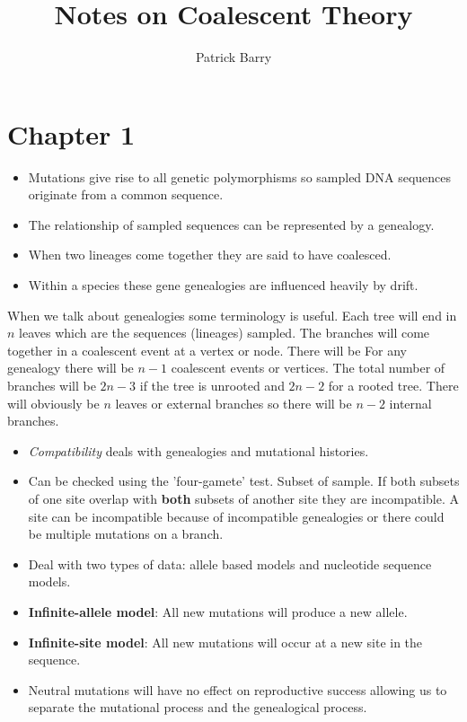 \documentclass[11pt, oneside]{article}
\title{Notes on Coalescent Theory}
\author{Patrick Barry}
\begin{document}
\maketitle
\section*{Chapter 1}
\begin{itemize}
\item{} Mutations give rise to all genetic polymorphisms so sampled DNA sequences 
originate from a common sequence. 
\item{} The relationship of sampled sequences can be represented by a genealogy.
\item{} When two lineages come together they are said to have coalesced. 
\item{} Within a species these gene genealogies are influenced heavily by drift.
\end{itemize} 

When we talk about genealogies some terminology is useful. Each tree will end in 
$n$ leaves which are the sequences (lineages) sampled. The branches 
will come together in a coalescent event at a vertex or node. There will be 
For any genealogy there will be $n-1$ coalescent events or vertices. The total number
of branches will be $2n-3$ if the tree is unrooted and $2n-2$ for a rooted tree. There 
will obviously be $n$ leaves or external branches so there will be $n-2$ internal 
branches. 

\begin{itemize}
\item{} \textit{Compatibility} deals with genealogies and mutational histories. 
\item{} Can be checked using the 'four-gamete' test.
	\subitem{} Subset of sample. If both subsets of one site overlap with
	\textbf{both} subsets of another site they are incompatible. A site can
	be incompatible because of incompatible genealogies or there could be
	multiple mutations on a branch.
\item{}Deal with two types of data: allele based models and nucleotide sequence models.
\item{} \textbf{Infinite-allele model}: All new mutations will produce a new allele. 
\item{} \textbf{Infinite-site model}: All new mutations will occur at a new site in the sequence.
\item{} Neutral mutations will have no effect on reproductive success allowing us to 
separate the mutational process and the genealogical process.
\end{itemize} 
\end{document}

